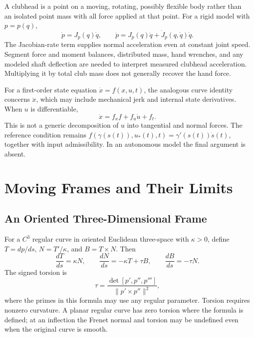 A clubhead is a point on a moving, rotating, possibly flexible body rather
than an isolated point mass with all force applied at that point. For a
rigid model with $p=p(q)$,
\begin{equation}
 \dot p=J_p(q)\dot q,\qquad
 \ddot p=J_p(q)\ddot q+\dot J_p(q,\dot q)\dot q.
\end{equation}
The Jacobian-rate term supplies normal acceleration even at constant joint
speed. Segment force and moment balances, distributed mass, hand wrenches,
and any modeled shaft deflection are needed to interpret measured clubhead
acceleration. Multiplying it by total club mass does not generally recover
the hand force.

For a first-order state equation $\dot x=f(x,u,t)$, the analogous curve
identity concerns $\ddot x$, which may include mechanical jerk and internal
state derivatives. When $u$ is differentiable,
\begin{equation}
 \ddot x=f_xf+f_u\dot u+f_t.
\end{equation}
This is not a generic decomposition of $u$ into tangential and normal
forces. The reference condition remains
$f(\gamma(s(t)),u_*(t),t)=\gamma'(s(t))\dot s(t)$, together with input
admissibility. In an autonomous model the final argument is absent.

\section{Moving Frames and Their Limits}

\subsection{An Oriented Three-Dimensional Frame}

For a $C^3$ regular curve in oriented Euclidean three-space with $\kappa>0$,
define $T=dp/ds$, $N=T'/\kappa$, and $B=T\times N$. Then
\begin{equation}\label{eq:frenet_serret}
 \frac{dT}{ds}=\kappa N,\qquad
 \frac{dN}{ds}=-\kappa T+\tau B,\qquad
 \frac{dB}{ds}=-\tau N.
\end{equation}
The signed torsion is
\begin{equation}
 \tau=\frac{\det[p',p'',p''']}{\|p'\times p''\|^2},
\end{equation}
where the primes in this formula may use any regular parameter. Torsion
requires nonzero curvature. A planar regular curve has zero torsion where
the formula is defined; at an inflection the Frenet normal and torsion may
be undefined even when the original curve is smooth.


